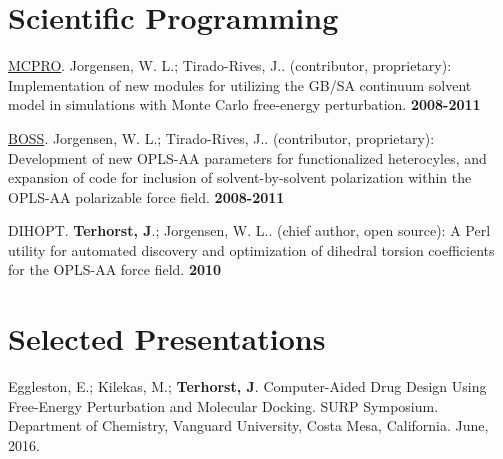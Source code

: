 \documentclass[10pt]{article}
\newcommand*\sciprog[5]{#1. #2. (#3): #4 \textbf{#5}}
\newcommand*\pres[8]{#1 #2. #3. #4, #5, #6. #7, #8.}
\begin{document}

\section{Scientific Programming}

\sciprog{\href{http://zarbi.chem.yale.edu/software.html}{MCPRO}}
{Jorgensen, W. L.; Tirado-Rives, J.}
{contributor, proprietary}
{Implementation of new modules for utilizing the GB/SA continuum solvent 
model in simulations with Monte Carlo free-energy perturbation.}
{2008-2011}

\sciprog{\href{http://zarbi.chem.yale.edu/software.html}{BOSS}}
{Jorgensen, W. L.; Tirado-Rives, J.}
{contributor, proprietary}
{Development of new OPLS-AA parameters for 
functionalized heterocyles, and expansion of code for 
inclusion of solvent-by-solvent polarization within the 
OPLS-AA polarizable force field.}
{2008-2011}

\sciprog{DIHOPT}
{\textbf{Terhorst, J}.; Jorgensen, W. L.}
{chief author, open source}
{A Perl utility for automated discovery and optimization 
of dihedral torsion coefficients for the OPLS-AA force field.}
{2010}


\section{Selected Presentations}


\pres{Eggleston, E.; Kilekas, M.; \textbf{Terhorst, J}.}
{Computer-Aided Drug Design Using Free-Energy Perturbation and Molecular Docking}
{SURP Symposium}
{Department of Chemistry}
{Vanguard University}
{Costa Mesa, California}
{June}{2016}
\end{document}
